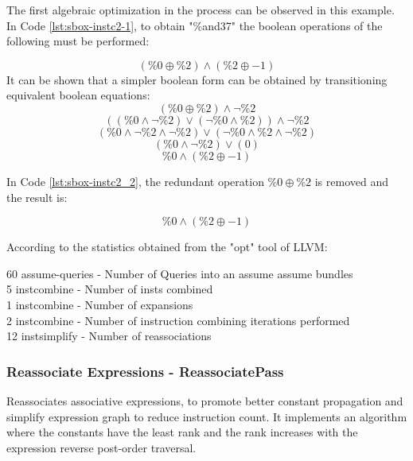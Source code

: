 



The first algebraic optimization in the process can be observed in this example. In Code \ref{lst:sbox-instc2-1}, to obtain "\%and37" the boolean operations of the following must be performed:

$$ (\%0 \oplus \%2)  \land ( \%2 \oplus -1)  $$
It can be shown that a simpler boolean form can be obtained by transitioning equivalent boolean equations:
$$ (\%0 \oplus \%2)  \land  \lnot \%2   $$
$$ ((\%0 \land \lnot \%2) \lor (\lnot \%0 \land \%2))  \land  \lnot \%2   $$
$$ (\%0 \land \lnot \%2\land  \lnot \%2) \lor (\lnot \%0 \land \%2\land  \lnot \%2)     $$
$$ (\%0 \land \lnot \%2) \lor (0)     $$
$$ \%0 \land (\%2 \oplus -1) $$

In Code \ref{lst:sbox-instc2_2}, the redundant operation $\%0 \oplus \%2$ is removed and the result is: 

$$ \%0  \land ( \%2 \oplus -1)  $$

According to the statistics obtained from the "opt" tool of LLVM:
\begin{displayquote}
60 assume-queries - Number of Queries into an assume assume bundles \\
 5 instcombine    - Number of insts combined \\
 1 instcombine    - Number of expansions \\
 2 instcombine    - Number of instruction combining iterations performed \\ 
12 instsimplify   - Number of reassociations \\
\end{displayquote}

\subsubsection{Reassociate Expressions - ReassociatePass}
Reassociates associative expressions, to promote better constant propagation and simplify expression graph to reduce instruction count. It implements an algorithm where the constants have the least rank and the rank increases with the expression reverse post-order traversal. 

